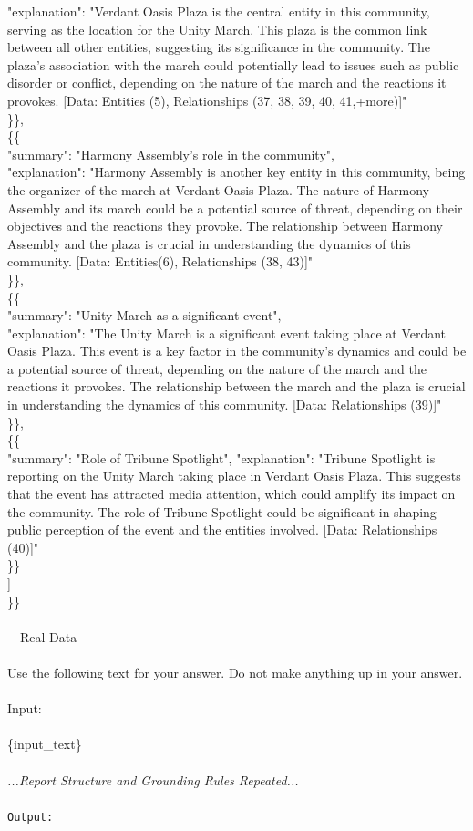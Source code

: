 {            "explanation": "Verdant Oasis Plaza is the central entity in this community, serving as the location for the Unity March. This plaza is the common link between all other entities, suggesting its significance in the community. The plaza's association with the march could potentially lead to issues such as public disorder or conflict, depending on the nature of the march and the reactions it provokes. [Data: Entities (5), Relationships (37, 38, 39, 40, 41,+more)]"\\
        \}\},\\
        \{\{\\
            "summary": "Harmony Assembly's role in the community",\\
            "explanation": "Harmony Assembly is another key entity in this community, being the organizer of the march at Verdant Oasis Plaza. The nature of Harmony Assembly and its march could be a potential source of threat, depending on their objectives and the reactions they provoke. The relationship between Harmony Assembly and the plaza is crucial in understanding the dynamics of this community. [Data: Entities(6), Relationships (38, 43)]"\\
        \}\},\\
        \{\{\\
            "summary": "Unity March as a significant event",\\
            "explanation": "The Unity March is a significant event taking place at Verdant Oasis Plaza. This event is a key factor in the community's dynamics and could be a potential source of threat, depending on the nature of the march and the reactions it provokes. The relationship between the march and the plaza is crucial in understanding the dynamics of this community. [Data: Relationships (39)]"\\
        \}\},\\
        \{\{\\
            "summary": "Role of Tribune Spotlight",
            "explanation": "Tribune Spotlight is reporting on the Unity March taking place in Verdant Oasis Plaza. This suggests that the event has attracted media attention, which could amplify its impact on the community. The role of Tribune Spotlight could be significant in shaping public perception of the event and the entities involved. [Data: Relationships (40)]"\\
        \}\}\\
    ]\\
\}\}\\
\\
---Real Data---\\
\\
Use the following text for your answer. Do not make anything up in your answer.\\
\\
Input:\\
\\
\{input\_text\}\\}
\textit{\\
...Report Structure and Grounding Rules Repeated...\\
\\}
\texttt{Output:}

